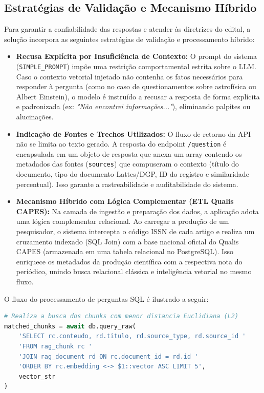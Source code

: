 \documentclass[12pt,a4paper]{article}
\begin{document}
\subsection{Estratégias de Validação e Mecanismo Híbrido}
Para garantir a confiabilidade das respostas e atender às diretrizes do edital, a solução incorpora as seguintes estratégias de validação e processamento híbrido:
\begin{itemize}
    \item \textbf{Recusa Explícita por Insuficiência de Contexto:} O prompt do sistema (\texttt{SIMPLE\_PROMPT}) impõe uma restrição comportamental estrita sobre o LLM. Caso o contexto vetorial injetado não contenha os fatos necessários para responder à pergunta (como no caso de questionamentos sobre astrofísica ou Albert Einstein), o modelo é instruído a recusar a resposta de forma explícita e padronizada (ex: \textit{"Não encontrei informações..."}), eliminando palpites ou alucinações.
    \item \textbf{Indicação de Fontes e Trechos Utilizados:} O fluxo de retorno da API não se limita ao texto gerado. A resposta do endpoint \texttt{/question} é encapsulada em um objeto de resposta que anexa um array contendo os metadados das fontes (\texttt{sources}) que compuseram o contexto (título do documento, tipo do documento Lattes/DGP, ID do registro e similaridade percentual). Isso garante a rastreabilidade e auditabilidade do sistema.
    \item \textbf{Mecanismo Híbrido com Lógica Complementar (ETL Qualis CAPES):} Na camada de ingestão e preparação dos dados, a aplicação adota uma lógica complementar relacional. Ao carregar a produção de um pesquisador, o sistema intercepta o código ISSN de cada artigo e realiza um cruzamento indexado (SQL Join) com a base nacional oficial do Qualis CAPES (armazenada em uma tabela relacional no PostgreSQL). Isso enriquece os metadados da produção científica com a respectiva nota do periódico, unindo busca relacional clássica e inteligência vetorial no mesmo fluxo.
\end{itemize}

O fluxo do processamento de perguntas SQL é ilustrado a seguir:
\begin{lstlisting}[language=Python, caption=Fluxo de Recuperação Vetorial raw SQL]
# Realiza a busca dos chunks com menor distancia Euclidiana (L2)
matched_chunks = await db.query_raw(
    'SELECT rc.conteudo, rd.titulo, rd.source_type, rd.source_id '
    'FROM rag_chunk rc '
    'JOIN rag_document rd ON rc.document_id = rd.id '
    'ORDER BY rc.embedding <-> $1::vector ASC LIMIT 5',
    vector_str
)
\end{lstlisting}
\end{document}
